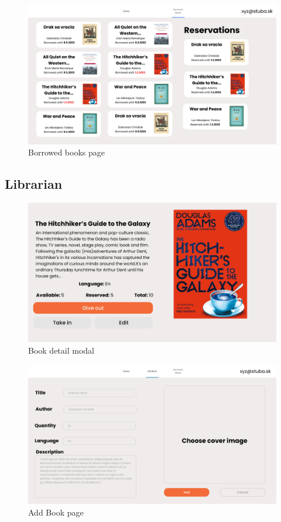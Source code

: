\documentclass[11pt,twoside,a4paper]{article}
\begin{document}
\begin{figure}[!ht]
    \includegraphics[scale=.2]{../mockups/Borrowed-books-Page.png}
    \centering
    \caption{Borrowed books page}
\end{figure}

\subsection*{Librarian}

\begin{figure}[!ht]
    \includegraphics[scale=.2]{../mockups/Librarian-book-detail-Modal.png}
    \centering
    \caption{Book detail modal}
\end{figure}

\begin{figure}[!ht]
    \includegraphics[scale=.2]{../mockups/Add-book-Page.png}
    \centering
    \caption{Add Book page}
\end{figure}
\end{document}
